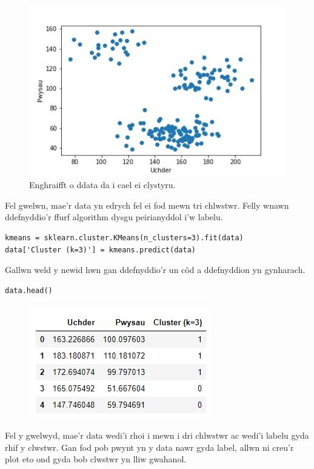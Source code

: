 \begin{figure}[H]
\begin{center}
\includegraphics[width=0.7\linewidth]{../img/Scatterpython.jpeg}
\end{center}
\caption{Enghraifft o ddata da i cael ei clystyru.}
\label{fig:Scatterpython}
\end{figure}

Fel gwelwn, mae'r data yn edrych fel ei fod mewn tri chlwstwr. Felly wnawn ddefnyddio'r ffurf algorithm dysgu peirianyddol i'w labelu.

\begin{verbatim}
kmeans = sklearn.cluster.KMeans(n_clusters=3).fit(data)
data['Cluster (k=3)'] = kmeans.predict(data)
\end{verbatim}

Gallwn weld y newid hwn gan ddefnyddio'r un c\^{o}d a ddefnyddion yn gynharach.

\begin{verbatim}
data.head()
\end{verbatim}

\begin{figure}[H]
\begin{center}
\includegraphics[width=0.35\linewidth]{../img/tabl2.jpg}
\end{center}
\label{fig:Data2}
\end{figure}

Fel y gwelwyd, mae'r data wedi'i rhoi i mewn i dri chlwstwr ac wedi'i labelu gyda rhif y clwstwr. Gan fod pob pwynt yn y data nawr gyda label, allwn ni creu'r plot eto ond gyda bob clwstwr yn lliw gwahanol.

